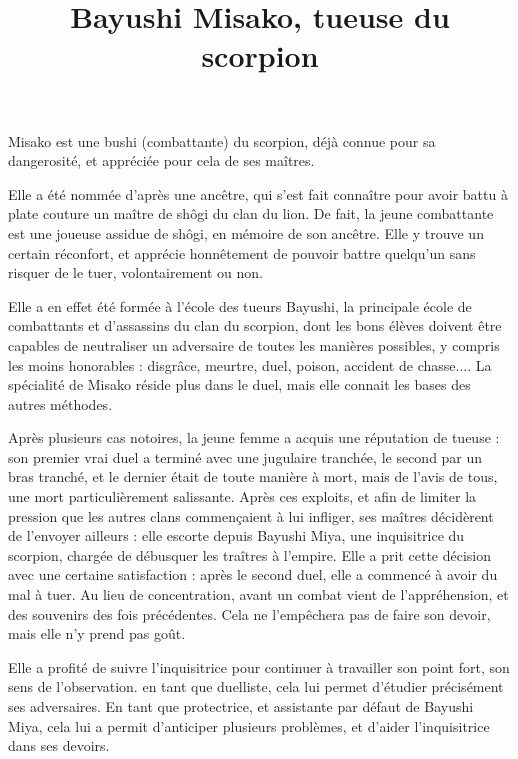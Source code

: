 \documentclass[10pt,a4paper]{article}
\title{Bayushi Misako, tueuse du scorpion}
\author{}
\date{}
\begin{document}
\maketitle
Misako est une bushi (combattante) du scorpion, déjà connue pour sa dangerosité, et appréciée pour cela de ses maîtres.

Elle a été nommée d'après une ancêtre, qui s'est fait connaître pour avoir battu à plate couture un maître de shôgi du clan du lion. De fait, la jeune combattante est une joueuse assidue de shôgi, en mémoire de son ancêtre. Elle y trouve un certain réconfort, et apprécie honnêtement de pouvoir battre quelqu'un sans risquer de le tuer, volontairement ou non.

Elle a en effet été formée à l'école des tueurs Bayushi, la principale école de combattants et d'assassins du clan du scorpion, dont les bons élèves doivent être capables de neutraliser un adversaire de toutes les manières possibles, y compris les moins honorables : disgrâce, meurtre, duel, poison, accident de chasse.... La spécialité de Misako réside plus dans le duel, mais elle connait les bases des autres méthodes.

Après plusieurs cas notoires, la jeune femme a acquis une réputation de tueuse : son premier vrai duel a terminé avec une jugulaire tranchée, le second par un bras tranché, et le dernier était de toute manière à mort, mais de l'avis de tous, une mort particulièrement salissante. Après ces exploits, et afin de limiter la pression que les autres clans commençaient à lui infliger, ses maîtres décidèrent de l'envoyer ailleurs : elle escorte depuis Bayushi Miya, une inquisitrice du scorpion, chargée de débusquer les traîtres à l'empire. Elle a prit cette décision avec une certaine satisfaction : après le second duel, elle a commencé à avoir du mal à tuer. Au lieu de concentration, avant un combat vient de l'appréhension, et des souvenirs des fois précédentes. Cela ne l'empêchera pas de faire son devoir, mais elle n'y prend pas goût.

Elle a profité de suivre l'inquisitrice pour continuer à travailler son point fort, son sens de l'observation. en tant que duelliste, cela lui permet d'étudier précisément ses adversaires. En tant que protectrice, et assistante par défaut de Bayushi Miya, cela lui a permit d'anticiper plusieurs problèmes, et d'aider l'inquisitrice dans ses devoirs. 
\end{document}
